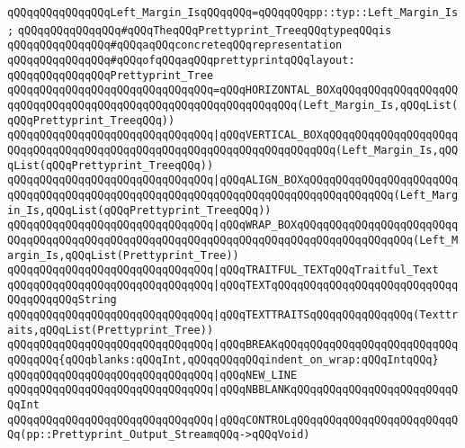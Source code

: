 \verb|qQQqqQQqqQQqqQQqLeft_Margin_IsqQQqqQQq=qQQqqQQqpp::typ::Left_Margin_Is;|\newline
\newline
\verb|qQQqqQQqqQQqqQQq#qQQqTheqQQqPrettyprint_TreeqQQqtypeqQQqis|\newline
\verb|qQQqqQQqqQQqqQQq#qQQqaqQQqconcreteqQQqrepresentation|\newline
\verb|qQQqqQQqqQQqqQQq#qQQqofqQQqaqQQqprettyprintqQQqlayout:|\newline
\newline
\verb|qQQqqQQqqQQqqQQqPrettyprint_Tree|\newline
\verb|qQQqqQQqqQQqqQQqqQQqqQQqqQQqqQQq=qQQqHORIZONTAL_BOXqQQqqQQqqQQqqQQqqQQqqQQqqQQqqQQqqQQqqQQqqQQqqQQqqQQqqQQqqQQqqQQq(Left_Margin_Is,qQQqList(qQQqPrettyprint_TreeqQQq))|\newline
\verb|qQQqqQQqqQQqqQQqqQQqqQQqqQQqqQQq|\verb#|qQQqVERTICAL_BOXqQQqqQQqqQQqqQQqqQQqqQQqqQQqqQQqqQQqqQQqqQQqqQQqqQQqqQQqqQQqqQQqqQQqqQQq(Left_Margin_Is,qQQqList(qQQqPrettyprint_TreeqQQq))#\newline
\verb|qQQqqQQqqQQqqQQqqQQqqQQqqQQqqQQq|\verb#|qQQqALIGN_BOXqQQqqQQqqQQqqQQqqQQqqQQqqQQqqQQqqQQqqQQqqQQqqQQqqQQqqQQqqQQqqQQqqQQqqQQqqQQqqQQqqQQq(Left_Margin_Is,qQQqList(qQQqPrettyprint_TreeqQQq))#\newline
\verb|qQQqqQQqqQQqqQQqqQQqqQQqqQQqqQQq|\verb#|qQQqWRAP_BOXqQQqqQQqqQQqqQQqqQQqqQQqqQQqqQQqqQQqqQQqqQQqqQQqqQQqqQQqqQQqqQQqqQQqqQQqqQQqqQQqqQQqqQQq(Left_Margin_Is,qQQqList(Prettyprint_Tree))#\newline
\verb|qQQqqQQqqQQqqQQqqQQqqQQqqQQqqQQq|\verb#|qQQqTRAITFUL_TEXTqQQqTraitful_Text#\newline
\verb|qQQqqQQqqQQqqQQqqQQqqQQqqQQqqQQq|\verb#|qQQqTEXTqQQqqQQqqQQqqQQqqQQqqQQqqQQqqQQqqQQqqQQqString#\newline
\verb|qQQqqQQqqQQqqQQqqQQqqQQqqQQqqQQq|\verb#|qQQqTEXTTRAITSqQQqqQQqqQQqqQQq(Texttraits,qQQqList(Prettyprint_Tree))#\newline
\verb|qQQqqQQqqQQqqQQqqQQqqQQqqQQqqQQq|\verb#|qQQqBREAKqQQqqQQqqQQqqQQqqQQqqQQqqQQqqQQqqQQq{qQQqblanks:qQQqInt,qQQqqQQqqQQqindent_on_wrap:qQQqIntqQQq}#\newline
\verb|qQQqqQQqqQQqqQQqqQQqqQQqqQQqqQQq|\verb#|qQQqNEW_LINE#\newline
\verb|qQQqqQQqqQQqqQQqqQQqqQQqqQQqqQQq|\verb#|qQQqNBBLANKqQQqqQQqqQQqqQQqqQQqqQQqqQQqInt#\newline
\verb|qQQqqQQqqQQqqQQqqQQqqQQqqQQqqQQq|\verb#|qQQqCONTROLqQQqqQQqqQQqqQQqqQQqqQQqqQQq(pp::Prettyprint_Output_StreamqQQq->qQQqVoid)#\newline
